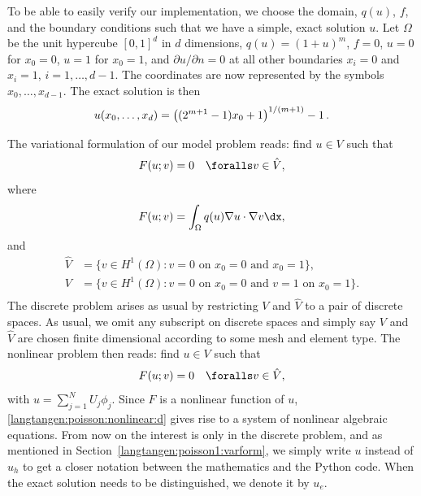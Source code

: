 To be able to easily verify our implementation, we choose the domain,
$q(u)$, $f$, and the boundary conditions such that we have a simple,
exact solution $u$. Let $\Omega$ be the unit hypercube $[0, 1]^d$ in
$d$ dimensions, $q(u)=(1+u)^m$, $f=0$, $u=0$ for $x_0=0$, $u=1$ for
$x_0=1$, and $\partial u/\partial n=0$ at all other boundaries $x_i=0$
and $x_i=1$, $i=1,\ldots,d-1$. The coordinates are now represented by
the symbols $x_0,\ldots,x_{d-1}$. The exact solution is then
\begin{equation}
u(x_0,\ldots,x_d) = \left((2^{m+1}-1)x_0 + 1\right)^{1/(m+1)} - 1\thinspace .
\end{equation}

The variational formulation of our model problem reads:
find $u \in V$ such that
\begin{equation} \label{langtangen:poisson:nonlinear1}
  F(u; v) = 0 \quad \foralls v \in \hat{V},
\end{equation}
where
\begin{equation}
\label{langtangen:poisson:nonlinear2}
F(u; v) = \int_\Omega q(u)\nabla u\cdot \nabla v\dx,
\end{equation}
and
\begin{equation}
  \begin{split}
    \hat{V} &= \{v \in H^1(\Omega) : v = 0 \mbox{ on } x_0=0\mbox{ and }x_0=1\}, \\
     V      &= \{v \in H^1(\Omega) : v = 0 \mbox{ on } x_0=0\mbox{ and } v = 1\mbox{ on }x_0=1\}. \\
  \end{split}
\end{equation}
The discrete problem arises as usual by restricting $V$ and $\hat V$
to a pair of discrete spaces. As usual, we omit any subscript on
discrete spaces and simply say $V$ and $\hat V$ are chosen finite
dimensional according to some mesh and element type.  The nonlinear
problem then reads: find $u\in V$ such that
\begin{equation}
  F(u; v) = 0 \quad \foralls v \in \hat{V},
\label{langtangen:poisson:nonlinear:d}
\end{equation}
with $u = \sum_{j=1}^N U_j \phi_j$. Since $F$ is a nonlinear function
of $u$, \eqref{langtangen:poisson:nonlinear:d} gives rise to a system
of nonlinear algebraic equations.  From now on the interest is only in
the discrete problem, and as mentioned in
Section~\ref{langtangen:poisson1:varform}, we simply write $u$ instead
of $u_h$ to get a closer notation between the mathematics and the
Python code. When the exact solution needs to be distinguished, we
denote it by $u_e$.

